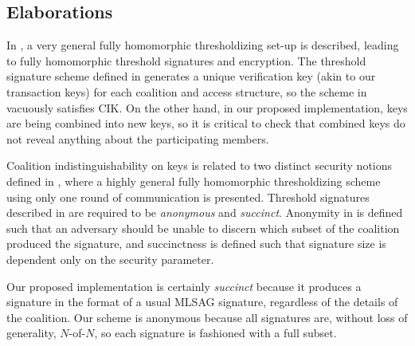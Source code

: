 \documentclass{mrl}
\theoremstyle{definition}
\begin{document}
\subsection{Elaborations}


 





In \cite{bonehthreshold}, a very general fully homomorphic thresholdizing set-up is described, leading to fully homomorphic threshold signatures and encryption. The threshold signature scheme defined in \cite{bonehthreshold} generates a unique verification key (akin to our transaction keys) for each coalition and access structure, so the scheme in \cite{bonehthreshold} vacuously satisfies CIK. On the other hand, in our proposed implementation, keys are being combined into new keys, so it is critical to check that combined keys do not reveal anything about the participating members.

Coalition indistinguishability on keys is related to two distinct security notions defined in \cite{bonehthreshold}, where a highly general fully homomorphic thresholdizing scheme using only one round of communication is presented. Threshold signatures described in \cite{bonehthreshold} are required to be \textit{anonymous} and \textit{succinct}. Anonymity in \cite{bonehthreshold} is defined such that an adversary should be unable to discern which subset of the coalition produced the signature, and succinctness is defined such that signature size is dependent only on the security parameter. 

Our proposed implementation is certainly \textit{succinct} because it produces a signature in the format of a usual MLSAG signature, regardless of the details of the coalition. Our scheme is anonymous because all signatures are, without loss of generality, $N$-of-$N$, so each signature is fashioned with a full subset. 
\end{document}
